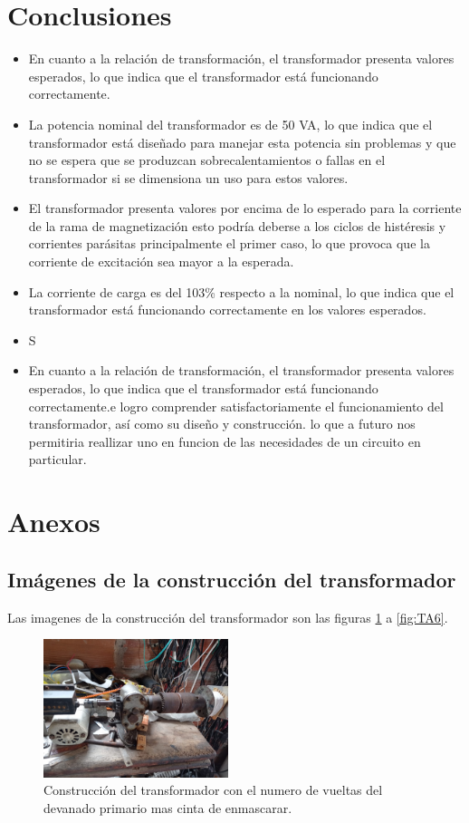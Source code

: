 \section{Conclusiones}
\begin{itemize}
    
    \item En cuanto a la relación de transformación, el transformador presenta valores esperados, lo que indica que el transformador está funcionando correctamente.
    \item La potencia nominal del transformador es de 50 VA, lo que indica que el transformador está diseñado para manejar esta potencia sin problemas y que no se espera que se produzcan sobrecalentamientos o fallas en el transformador si se dimensiona un uso para estos valores.
    \item El transformador presenta valores por encima de lo esperado para la corriente de la rama de magnetización esto podría deberse a los ciclos de histéresis y corrientes parásitas principalmente el primer caso, lo que provoca que la corriente de excitación sea mayor a la esperada. 
    \item La corriente de carga es del 103\% respecto a la nominal, lo que indica que el transformador está funcionando correctamente en los valores esperados.
    \item S\item En cuanto a la relación de transformación, el transformador presenta valores esperados, lo que indica que el transformador está funcionando correctamente.e logro comprender satisfactoriamente el funcionamiento del transformador, así como su diseño y construcción. lo que a futuro nos permitiria reallizar uno en funcion de las necesidades de un circuito en particular.
\end{itemize}






\section{Anexos}
\subsection{Imágenes de la construcción del transformador}
Las imagenes de la construcción del transformador son las figuras \ref{fig:TA1} a \ref{fig:TA6}.
\begin{figure}[ht!]
    \centering
    \includegraphics[width=0.48\textwidth]{fot/TA1.jpg}
    \caption{Construcción del transformador con el numero de vueltas del devanado primario mas cinta de enmascarar.}
    \label{fig:TA1}
\end{figure}

